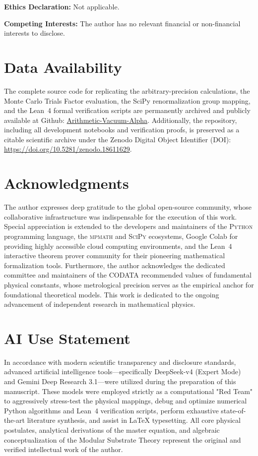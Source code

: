 \documentclass[12pt,a4paper]{article}
\begin{document}
\vspace{0.5em}
\noindent\textbf{Ethics Declaration:} Not applicable.

\vspace{0.5em}
\noindent\textbf{Competing Interests:} The author has no relevant financial or non-financial interests to disclose.

\section*{Data Availability}
The complete source code for replicating the arbitrary-precision calculations, the Monte Carlo Trials Factor evaluation, the SciPy renormalization group mapping, and the Lean~4 formal verification scripts are permanently archived and publicly available at Github: \href{https://github.com/NachoPeinador/Arithmetic-Vacuum-Alpha}{Arithmetic-Vacuum-Alpha}. Additionally, the repository, including all development notebooks and verification proofs, is preserved as a citable scientific archive under the Zenodo Digital Object Identifier (DOI): \href{https://zenodo.org/records/18611629}{https://doi.org/10.5281/zenodo.18611629}.

\section*{Acknowledgments}
The author expresses deep gratitude to the global open-source community, whose collaborative infrastructure was indispensable for the execution of this work. Special appreciation is extended to the developers and maintainers of the \textsc{Python} programming language, the \textsc{mpmath} and \textsc{SciPy} ecosystems, Google Colab for providing highly accessible cloud computing environments, and the Lean~4 interactive theorem prover community for their pioneering mathematical formalization tools. Furthermore, the author acknowledges the dedicated committee and maintainers of the CODATA recommended values of fundamental physical constants, whose metrological precision serves as the empirical anchor for foundational theoretical models. This work is dedicated to the ongoing advancement of independent research in mathematical physics.

\section*{AI Use Statement}
In accordance with modern scientific transparency and disclosure standards, advanced artificial intelligence tools—specifically DeepSeek-v4 (Expert Mode) and Gemini Deep Research 3.1—were utilized during the preparation of this manuscript. These models were employed strictly as a computational "Red Team" to aggressively stress-test the physical mappings, debug and optimize numerical Python algorithms and Lean~4 verification scripts, perform exhaustive state-of-the-art literature synthesis, and assist in LaTeX typesetting. All core physical postulates, analytical derivations of the master equation, and algebraic conceptualization of the Modular Substrate Theory represent the original and verified intellectual work of the author.
\end{document}
